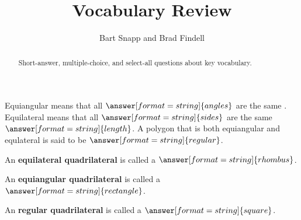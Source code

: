\documentclass[nooutcomes]{ximera}
\title{Vocabulary Review}
\author{Bart Snapp and Brad Findell}
\begin{document}
\begin{abstract}
Short-answer, multiple-choice, and select-all questions about key vocabulary. 
\end{abstract}
\maketitle

%


\begin{question}
Equiangular means that all $\answer[format=string]{angles}$ are the same .  
Equilateral means that all $\answer[format=string]{sides}$ are the same $\answer[format=string]{length}$.  A polygon that is both equiangular and equlateral is said to be $\answer[format=string]{regular}$.  
\end{question}

\begin{question}  
An \textbf{equilateral quadrilateral} is called a $\answer[format=string]{rhombus}$.
\end{question}

\begin{question}  
An \textbf{equiangular quadrilateral} is called a $\answer[format=string]{rectangle}$. 
\end{question}

\begin{question}  
An \textbf{regular quadrilateral} is called a $\answer[format=string]{square}$. 
\end{question}


%
%
\end{document}
